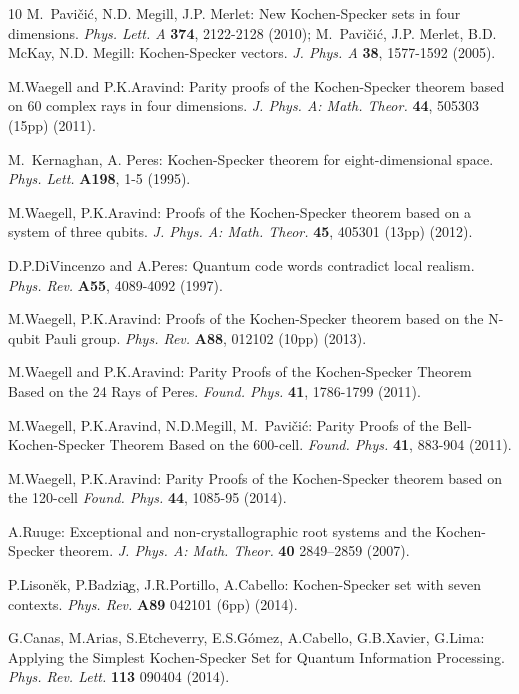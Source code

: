 \begin{thebibliography}{10}
M.~Pavi{\v c}i{\'c}, N.D. Megill, J.P. Merlet: New Kochen-Specker sets in four dimensions. {\it Phys. Lett. A} \textbf{{\bf 374}}, 2122-2128 (2010); M.~Pavi{\v c}i{\'c}, J.P. Merlet, B.D. Mc{K}ay, N.D. Megill: Kochen-Specker vectors. {\it J. Phys. A} \textbf{{\bf 38}}, 1577-1592 (2005).

M.Waegell and P.K.Aravind: Parity proofs of the Kochen-Specker theorem based on 60 complex rays in four dimensions. {\it J. Phys. A: Math. Theor.} {\bf 44}, 505303 (15pp) (2011).

M.~Kernaghan, A. Peres: Kochen-Specker theorem for eight-dimensional space. {\it Phys. Lett.} \textbf{{\bf A198}}, 1-5 (1995).

M.Waegell, P.K.Aravind: Proofs of the Kochen-Specker theorem based on a system of three qubits. {\it J. Phys. A: Math. Theor.} \textbf{{\bf 45}}, 405301 (13pp) (2012).

D.P.DiVincenzo and A.Peres: Quantum code words contradict local realism. {\it Phys. Rev.} \textbf{{\bf A55}}, 4089-4092 (1997).

M.Waegell, P.K.Aravind: Proofs of the Kochen-Specker theorem based on the N-qubit Pauli group. {\it Phys. Rev.} \textbf{{\bf A88}}, 012102 (10pp) (2013).

M.Waegell and P.K.Aravind: Parity Proofs of the Kochen-Specker Theorem Based on the 24 Rays of Peres. {\it Found. Phys.} {\bf 41}, 1786-1799 (2011).

M.Waegell, P.K.Aravind, N.D.Megill, M.~Pavi{\v c}i{\'c}: Parity Proofs of the Bell-Kochen-Specker Theorem Based on the 600-cell. {\it Found. Phys.} \textbf{{\bf 41}}, 883-904 (2011).

M.Waegell, P.K.Aravind: Parity Proofs of the Kochen-Specker theorem based on the 120-cell {\it Found. Phys.} \textbf{{\bf 44}}, 1085-95 (2014).

A.Ruuge: Exceptional and non-crystallographic root systems and the Kochen-Specker theorem. {\it J. Phys. A: Math. Theor.} {\bf 40} 2849–2859 (2007).

P.Lison{\u e}k, P.Badzi{\c a}g, J.R.Portillo, A.Cabello: Kochen-Specker set with seven contexts. {\it  Phys. Rev.} {\bf A89} 042101 (6pp) (2014).

G.Canas, M.Arias, S.Etcheverry, E.S.G{\'o}mez, A.Cabello, G.B.Xavier, G.Lima: Applying the Simplest Kochen-Specker Set for Quantum Information Processing. {\it  Phys. Rev. Lett.} {\bf 113} 090404 (2014).


\end{thebibliography}
